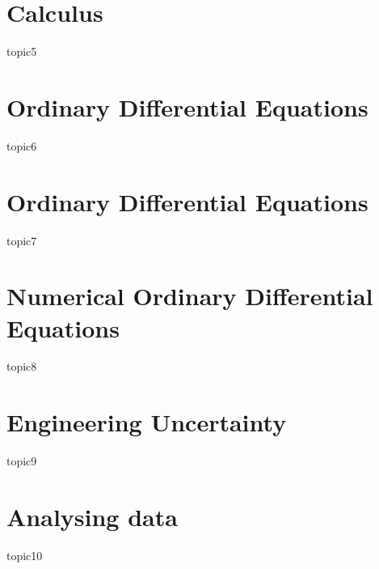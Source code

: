 \documentclass[12pt,a4paper]{article}
\begin{document}
	\tableofcontents
    \section{Calculus}
    {topic5}
    \section{Ordinary Differential Equations}
    {topic6}
    \section{Ordinary Differential Equations}
    {topic7}
    \section{Numerical Ordinary Differential Equations}
    {topic8}
    \section{Engineering Uncertainty}
    {topic9}
    \section{Analysing data}
    {topic10}
\end{document}
